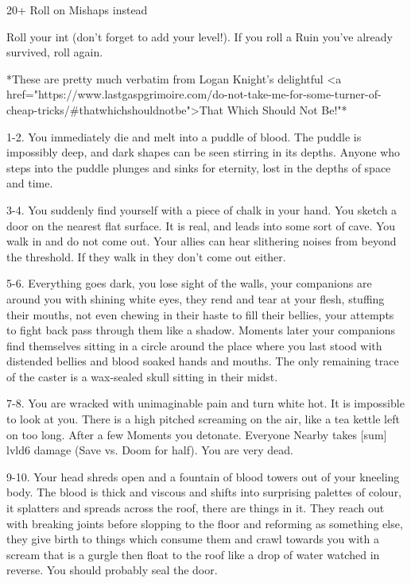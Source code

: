 20+  Roll on Mishaps instead









Roll your {int} (don't forget to add your level!).   If you roll a Ruin you've already survived, roll again.

*These are pretty much verbatim from Logan Knight's delightful <a href="https://www.lastgaspgrimoire.com/do-not-take-me-for-some-turner-of-cheap-tricks/#thatwhichshouldnotbe">That Which Should Not Be!"*




1-2. You immediately die and melt into a puddle of blood.  The puddle is impossibly deep, and dark shapes can be seen stirring in its depths.  Anyone who steps into the puddle plunges and sinks for eternity, lost in the depths of space and time.



3-4. You suddenly find yourself with a piece of chalk in your hand. You sketch a door on the nearest flat surface. It is real, and leads into some sort of cave. You walk in and do not come out. Your allies can hear slithering noises from beyond the threshold.  If they walk in they don't come out either.



5-6. Everything goes dark, you lose sight of the walls, your companions are around you with shining white eyes, they rend and tear at your flesh, stuffing their mouths, not even chewing in their haste to fill their bellies, your attempts to fight back pass through them like a shadow.  Moments later your companions find themselves sitting in a circle around the place where you last stood with distended bellies and blood soaked hands and mouths. The only remaining trace of the caster is a wax-sealed skull sitting in their midst. 



7-8. You are wracked with unimaginable pain and turn white hot.  It is impossible to look at you.  There is a high pitched screaming on the air, like a tea kettle left on too long.  After a few Moments you detonate.  Everyone Nearby takes [sum] {lvl}d6 damage (Save vs. Doom for half).  You are very dead.



9-10. Your head shreds open and a fountain of blood towers out of your kneeling body. The blood is thick and viscous and shifts into surprising palettes of colour, it splatters and spreads across the roof, there are things in it. They reach out with breaking joints before slopping to the floor and reforming as something else, they give birth to things which consume them and crawl towards you with a scream that is a gurgle then float to the roof like a drop of water watched in reverse.  You should probably seal the door.



